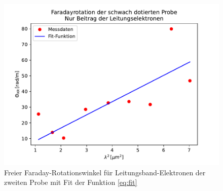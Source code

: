 \begin{figure}
\includegraphics{content/grafiken/probe2leitungs.pdf}
\caption{Freier Faraday-Rotationswinkel für Leitungsband-Elektronen der zweiten Probe mit Fit der Funktion \autoref{eq:fit}}
\label{fig:probe2leit}
\end{figure}

























